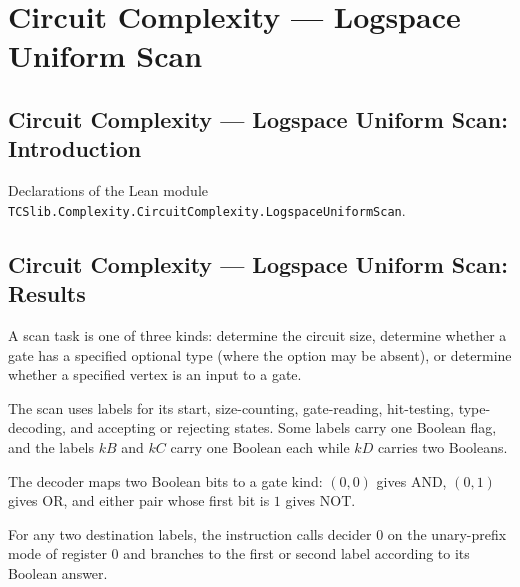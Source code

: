 \section{Circuit Complexity --- Logspace Uniform Scan}
\subsection*{Circuit Complexity --- Logspace Uniform Scan: Introduction}

Declarations of the Lean module \texttt{TCSlib.Complexity.CircuitComplexity.LogspaceUniformScan}.

\subsection*{Circuit Complexity --- Logspace Uniform Scan: Results}

\begin{definition}
\label{BoolCircuit.AdjScan.Task}
\leanok
{}
A scan task is one of three kinds: determine the circuit size, determine whether a gate
has a specified optional type (where the option may be absent), or determine whether a
specified vertex is an input to a gate.
\end{definition}

\begin{definition}
\label{BoolCircuit.AdjScan.Lbl}
\leanok
The scan uses labels for its start, size-counting, gate-reading, hit-testing,
type-decoding, and accepting or rejecting states. Some labels carry one Boolean flag,
and the labels $kB$ and $kC$ carry one Boolean each while $kD$ carries two Booleans.
\end{definition}

\begin{definition}
\label{BoolCircuit.AdjScan.decodeKind}
\leanok
{}
The decoder maps two Boolean bits to a gate kind: $(0,0)$ gives AND, $(0,1)$ gives OR,
and either pair whose first bit is $1$ gives NOT.
\end{definition}

\begin{definition}
\label{BoolCircuit.AdjScan.rd}
\leanok
{}
For any two destination labels, the instruction calls decider $0$ on the unary-prefix
mode of register $0$ and branches to the first or second label according to its Boolean
answer.
\end{definition}


